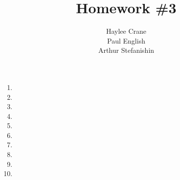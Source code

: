 \documentclass[11pt, oneside]{article}
\title{Homework \#3}
\author{
Haylee Crane \\
Paul English \\
Arthur Stefanishin
}
\begin{document}
\maketitle

\begin{enumerate}

\item 
\item 
\item 
\item 
\item 
\item 
\item 
\item 
\item 
\item 

\end{enumerate}
\end{document}
